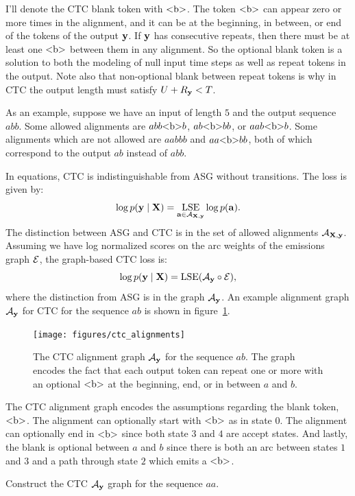 I'll denote the CTC blank token with $\textrm{\textless b\textgreater}$. The token $\textrm{\textless b\textgreater}$ can appear
zero or more times in the alignment, and it can be at the beginning, in between,
or end of the tokens of the output ${\bf y}$. If ${\bf y}$ has consecutive repeats,
then there must be at least one $\textrm{\textless b\textgreater}$ between them in any alignment. So the
optional blank token is a solution to both the modeling of null input time
steps as well as repeat tokens in the output. Note also that non-optional blank
between repeat tokens is why in CTC the output length must satisfy $U + R_{\bf y} <
T$.

As an example, suppose we have an input of length $5$ and the output sequence
$abb$. Some allowed alignments are $abb \textrm{\textless b\textgreater} b$, $ab \textrm{\textless b\textgreater} bb$, or $aa b
\textrm{\textless b\textgreater} b$. Some alignments which are not allowed are $aabbb$ and $aa\textrm{\textless b\textgreater} b
b$, both of which correspond to the output $ab$ instead of $abb$.

In equations, CTC is indistinguishable from ASG without transitions. The loss
is given by:
$$
\log p({\bf y} \mid {\bf X}) = \operatorname*{\textrm{LSE}}_{{\bf a} \in \mathcal{A}_{{\bf X}, {\bf y}}} \log p({\bf a}).
$$
The distinction between ASG and CTC is in the set of allowed alignments
$\mathcal{A}_{{\bf X}, {\bf y}}$. Assuming we have log normalized scores on the arc weights of
the emissions graph $\mathcal{E}$, the graph-based CTC loss is:
$$
\log p({\bf y} \mid {\bf X}) = \operatorname*{\textrm{LSE}}(\mathcal{A}_{\bf y} \circ \mathcal{E}),
$$
where the distinction from ASG is in the graph $\mathcal{A}_{\bf y}$. An example alignment
graph $\mathcal{A}_{\bf y}$ for CTC for the sequence $ab$ is shown in
figure~\ref{fig:ctc_alignments}.

\begin{figure}
    \centering
    \texttt{[image: figures/ctc\_alignments]}
    \caption{The CTC alignment graph $\mathcal{A}_{\bf y}$ for the sequence $ab$. The graph
    encodes the fact that each output token can repeat one or more with an
    optional $\textrm{\textless b\textgreater}$ at the beginning, end, or in between $a$ and $b$.}
    \label{fig:ctc_alignments}
\end{figure}

The CTC alignment graph encodes the assumptions regarding the blank
token, $\textrm{\textless b\textgreater}$. The alignment can optionally start with $\textrm{\textless b\textgreater}$ as in state
$0$. The alignment can optionally end in $\textrm{\textless b\textgreater}$ since both state $3$ and $4$
are accept states. And lastly, the blank is optional between $a$ and $b$ since
there is both an arc between states $1$ and $3$ and a path through state $2$
which emits a $\textrm{\textless b\textgreater}$.

\begin{example}
Construct the CTC $\mathcal{A}_{\bf y}$ graph for the sequence $aa$.
\end{example}

